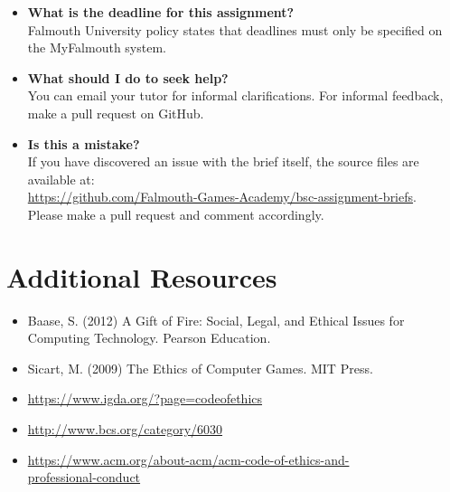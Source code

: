 \documentclass{../../fal_assignment}
\begin{document}
\begin{itemize}
	\item 	\textbf{What is the deadline for this assignment?} \\ 
    		Falmouth University policy states that deadlines must only be specified on the MyFalmouth system.
    		
	\item 	\textbf{What should I do to seek help?} \\ 
    		You can email your tutor for informal clarifications. For informal feedback, make a pull request on GitHub. 
    		
    	\item 	\textbf{Is this a mistake?} \\ 	
    		If you have discovered an issue with the brief itself, the source files are available at: \\
    		\url{https://github.com/Falmouth-Games-Academy/bsc-assignment-briefs}.\\
    		 Please make a pull request and comment accordingly.
\end{itemize}

\section*{Additional Resources}

\begin{itemize}
    \item Baase, S. (2012) A Gift of Fire: Social, Legal, and Ethical Issues for Computing Technology. Pearson Education.
    \item Sicart, M. (2009) The Ethics of Computer Games. MIT Press.
    \item \url{https://www.igda.org/?page=codeofethics}
    \item \url{http://www.bcs.org/category/6030}
    \item \url{https://www.acm.org/about-acm/acm-code-of-ethics-and-} \\ \url{professional-conduct}
\end{itemize}

\rubricyeartwo
\end{document}
